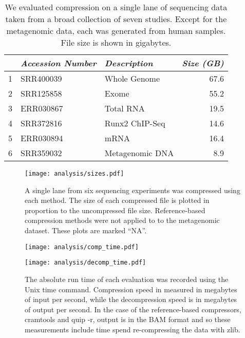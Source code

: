 \documentclass[twocolumn]{article}
\begin{document}
\begin{table}
\begin{tabular}{rllr}
  & \textit{Accession Number} & \textit{Description} & \textit{Size (GB)} \\ \hline
1 & SRR400039                 & Whole Genome         & 67.6 \\
2 & SRR125858                 & Exome                & 55.2 \\
3 & ERR030867                 & Total RNA            & 19.5 \\
4 & SRR372816                 & Runx2 ChIP-Seq       & 14.6 \\
5 & ERR030894                 & mRNA                 & 16.4 \\
6 & SRR359032                 & Metagenomic DNA      &  8.9 \\
\end{tabular}
\caption{
We evaluated compression on a single lane of sequencing data taken from a
broad collection of seven studies. Except for the metagenomic data, each was
generated from human samples. File size is shown in gigabytes.
}
\label{tab:datasets}
\end{table}


\begin{figure*}
\centerline{\texttt{[image: analysis/sizes.pdf]}}
\caption{
A single lane from six sequencing experiments was compressed using each
method. The size of each compressed file is plotted in proportion to the
uncompressed file size. Reference-based compression methods were not applied to
to the metagenomic dataset. These plots are marked ``NA''.
}
\label{fig:sizes}
\end{figure*}

\begin{figure*}
\centerline{\texttt{[image: analysis/comp\_time.pdf]}}
\centerline{\texttt{[image: analysis/decomp\_time.pdf]}}
\caption{
The absolute run time of each evaluation was recorded using the Unix time
command. Compression speed in measured in megabytes of input per second, while
the decompression speed is in megabytes of output per second. In the case of
the reference-based compressors, cramtools and quip -r, output is in the BAM
format and so these measurements include time spend re-compressing the data
with zlib.
}
\label{fig:comp_decomp_time}
\end{figure*}
\end{document}
